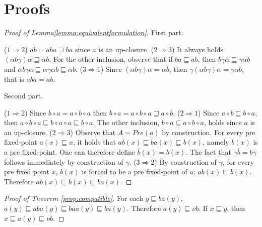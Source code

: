 \documentclass{llncs}
\begin{document}
\section{Proofs}\label{app:proof}
\begin{proof}[Proof of Lemma\ref{lemma:equivalentformulation}]
First part.

($1\Rightarrow 2$) $ab = aba \sqsupseteq ba$ since $a$ is an up-closure. ($2\Rightarrow 3$) It always holds $(\alpha b \gamma) \alpha \sqsupseteq \alpha b$. For the other inclusion, observe that if $ba \sqsubseteq ab$, then $b\gamma \alpha \sqsubseteq \gamma \alpha b$ and  $\alpha b\gamma \alpha \sqsubseteq \alpha \gamma \alpha b \sqsubseteq \alpha b$.
($3 \Rightarrow 1$) Since $(\alpha b \gamma) \alpha = \alpha b$, then $\gamma (\alpha b \gamma) \alpha = \gamma\alpha b$, that is $aba = ab$.

Second part.

($1\Rightarrow 2$) Since $b\circ a = a\circ b\circ a$ then $b\circ a = a\circ b\circ a \sqsupseteq a\circ b$. 
%
($2\Rightarrow 1$) Since $a\circ b \sqsubseteq b\circ a$, then $a\circ b \circ a \sqsubseteq b\circ a \circ a \sqsubseteq b \circ a$. The other inclusion, $b\circ a \subseteq  a\circ b\circ a$, holds since $a$ is an up-closure.
%
 ($2\Rightarrow 3$) Observe that $A=Pre(a)$ by construction. For every pre fixed-point $a(x)\sqsubseteq x$, it holds that $ab(x) \sqsubseteq ba(x)\sqsubseteq b(x)$, namely $b(x)$ is a pre fixed-point. One can therefore define $\overline{b}(x) = b(x)$. The fact that $\gamma \overline{b} =  b \gamma$ follows immediately by construction of $\gamma$. 
 ($3 \Rightarrow 2$) By construction of $\gamma$, for every pre fixed point $x$, $b(x)$ is forced to be a pre fixed-point of $a$: $ab(x)\sqsubseteq b(x)$. Therefore  $ab(x)\sqsubseteq b(x) \sqsubseteq ba(x)$.
\end{proof}

\begin{proof}[Proof of Theorem \ref{prop:compatible}]
For each $y\sqsubseteq ba(y)$, $a(y)\sqsubseteq aba(y) \sqsubseteq baa(y) \sqsubseteq ba(y)$. Therefore $a(y)\sqsubseteq \nu b$. If $x\sqsubseteq y$, then $x\sqsubseteq a(y)\sqsubseteq \nu b$.
\end{proof}
%
\end{document}
